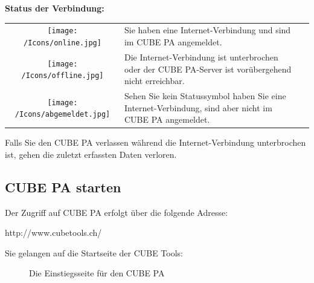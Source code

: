 \vspace{\baselineskip}

\textbf{Status der Verbindung:}

\vspace{\baselineskip}

\begin{tabular}{c | p{14cm} l} %

\vspace{+1pt}	
\texttt{[image: /Icons/online.jpg]} & Sie haben eine Internet-Verbindung und sind im CUBE PA angemeldet. \\
\vspace{+1pt}	
\texttt{[image: /Icons/offline.jpg]} & Die Internet-Verbindung ist unterbrochen oder der CUBE PA-Server ist vorübergehend nicht erreichbar. \\
\vspace{+1pt}	
\texttt{[image: /Icons/abgemeldet.jpg]} & Sehen Sie kein Statussymbol haben Sie eine Internet-Verbindung, sind aber nicht im CUBE PA angemeldet. \\


\end{tabular}

\vspace{\baselineskip}

Falls Sie den CUBE PA verlassen während die Internet-Verbindung unterbrochen ist, gehen die zuletzt erfassten Daten verloren.

\subsection{CUBE PA starten}


Der Zugriff auf CUBE PA erfolgt über die folgende Adresse:

\vspace{\baselineskip}

{\color{red} http://www.cubetools.ch/}

\vspace{\baselineskip}

Sie gelangen auf die Startseite der CUBE Tools:

\begin{figure}[H]
\caption{Die Einstiegsseite für den CUBE PA}
\end{figure}

